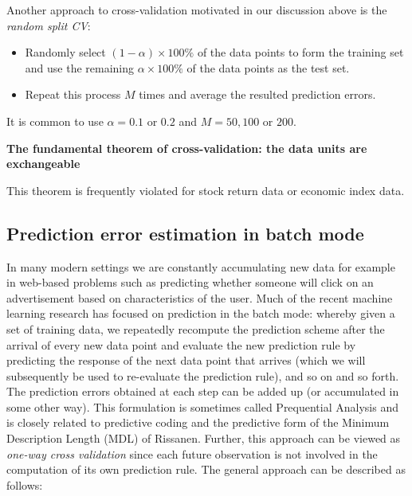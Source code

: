 Another approach to cross-validation motivated in our discussion above is the \textit{random split CV}:

\begin{itemize}
\item Randomly select $(1 - \alpha) \times 100\%$ of the data points to form the training set and use the remaining $\alpha \times 100\%$ of the data points as the test set. 
\item Repeat this process $M$ times and average the resulted prediction errors. 
\end{itemize}

It is common to use $\alpha = 0.1$ or $0.2$ and $M = 50, 100$ or $200$.



\textbf{The fundamental theorem of cross-validation: the data units are exchangeable}

This theorem is frequently violated for stock return data or economic index data.



\subsection*{Prediction error estimation in batch mode}


In many modern settings we are constantly accumulating new data for example in web-based problems such as predicting whether someone will click on an advertisement based on characteristics of the user. Much of the recent machine learning research has focused on prediction in the batch mode: whereby given a set of training data, we repeatedly recompute the prediction scheme after the arrival of every new data point and evaluate the new prediction rule by predicting the response of the next data point that arrives (which we will subsequently be used to re-evaluate the prediction rule), and so on and so forth. The prediction errors obtained at each step can be added up (or accumulated in some other way). This formulation is sometimes called Prequential Analysis and is closely related to predictive coding and the predictive form of the Minimum Description Length (MDL) of Rissanen. Further, this approach can be viewed as \textit{one-way cross validation} since each future observation is not involved in the computation of its own prediction rule. The general approach can be described as follows:

